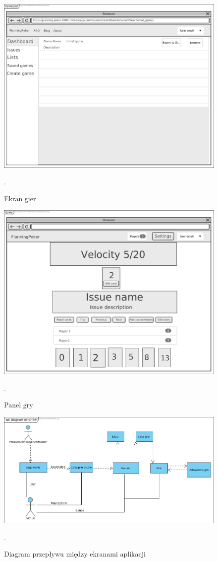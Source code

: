 \begin{figure}[H]
	\centering\includegraphics[width=.7\textwidth]{img/GamesList}
	\caption{Ekran gier}.
	\label{rys:GamesList}
\end{figure}

\begin{figure}[H]
	\centering\includegraphics[width=.7\textwidth]{img/GameScreen}
	\caption{Panel gry}.
	\label{rys:GameScreen}
\end{figure}

\begin{figure}[H]
	\centering\includegraphics[width=\textwidth]{img/ScreensDiagram}
	\caption{Diagram przepływu między ekranami aplikacji}.
	\label{rys:ScreensDiagram}
\end{figure}

